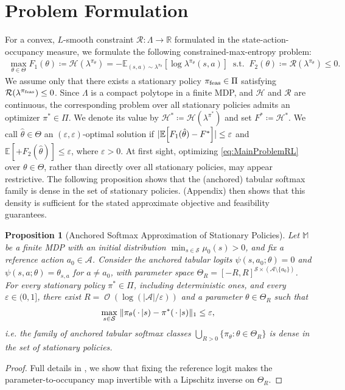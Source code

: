 \documentclass{article}
\theoremstyle{plain}
\newtheorem{proposition}[theorem]{Proposition}
\theoremstyle{definition}
\theoremstyle{remark}
\def\RR{{\mathbb{R}}}
\def\SS{{\mathcal{S}}}
\def\AA{{\mathcal{A}}}
\DeclareMathOperator{\OOSym}{\mathcal{O}}
\newcommand{\OO}[1]{{\OOSym\!\left(#1\right)}}
\newcommand{\card}[1]{\left|#1\right|}
\def\epsilon{{\varepsilon}}
\newcommand{\Exp}[1]{{ \mathbb{E}}\!\left[#1\right]}
\newcommand{\Expu}[2]{{\mathbb{E}}_{#1}\!\left[#2\right]}
\newcommand{\innerEmpty}{\,\cdot\,}
\DeclarePairedDelimiter{\abs}{\lvert}{\rvert}
\DeclarePairedDelimiter{\norm}{\lVert}{\rVert}
\DeclarePairedDelimiter{\plus}{[}{]_{+}}
\newcommand{\define}{\coloneqq}
\def\ss{{s}}
\def\MM{{\mathbb{M}}}
\def\HH{{\mathcal{H}}}
\def\Fopt{{F^*}}
\def\thetaHat{{\hat{\theta}}}
\def\aa{{a}}
\def\ss{{s}}
\def\Reg{{\mathcal{R}}}
\begin{document}
\section{Problem Formulation}
\label{sec:ProblemFormulation}
For a convex, $L$-smooth constraint $\Reg: \Lambda \to \RR$ formulated in
the state-action-occupancy measure, we formulate the following
constrained-max-entropy problem:
\begin{align}
 \max_{\theta \in \Theta} F_1(\theta)  \define \HH(\lambda^{\pi_\theta})
 = - \Expu{(\ss, \aa) \sim \lambda^{\pi_\theta}}{\log \lambda^{\pi_\theta}(\ss, \aa)} \;\;
 \mathrm{s.t.} \;\; F_2(\theta)        \define
 \Reg(\lambda^{\pi_\theta}) \leq 0.
 \tag{CME}
 \label{eq:MainProblemRL}
\end{align}
We assume only that there exists a stationary policy
$\pi_{\rm feas}\in\Pi$ satisfying
$\Reg(\lambda^{\pi_{\rm feas}})\leq0$. Since $\Lambda$ is a compact
polytope in a finite MDP, and $\HH$ and $\Reg$ are continuous, the
corresponding problem over all stationary policies admits an optimizer
$\pi^*\in\Pi$. We denote its value by
$\HH^*\define\HH(\lambda^{\pi^*})$ and set $\Fopt\define\HH^*$.
We call $\thetaHat \in \Theta$
an $(\epsilon,\epsilon)$-optimal solution if
$\abs{\Exp{F_1(\thetaHat)- \Fopt}} \leq \epsilon$
and $\Exp{\plus{F_2(\thetaHat)}} \leq \epsilon$,
where $\epsilon> 0$. At first sight, optimizing
\eqref{eq:MainProblemRL} over $\theta\in\Theta$, rather than directly over
all stationary policies, may appear restrictive. The following proposition
shows that the (anchored) tabular softmax family is dense in the set of
stationary policies.  (Appendix)
then shows that this density is sufficient for the stated approximate objective and
feasibility guarantees.
\begin{proposition}[Anchored Softmax Approximation of Stationary Policies]
 \label{prop:SoftmaxApproximationStationaryPolicies}
 Let $\MM$ be a finite MDP with an initial distribution
 $\min_{\ss \in \SS}\mu_0(\ss) > 0$, and fix a reference action
 $\aa_0\in\AA$. Consider the anchored tabular logits
 $\psi(\ss,\aa_0;\theta)=0$ and
 $\psi(\ss,\aa;\theta)=\theta_{\ss,\aa}$ for $\aa\neq\aa_0$, with
 parameter space
 $\Theta_R=[-R,R]^{\SS\times(\AA\setminus\{\aa_0\})}$.
 For every stationary policy $\pi^* \in \Pi$, including deterministic
 ones, and every $\epsilon \in (0,1]$, there exist
 $R = \OO{\log(\card{\AA} / \epsilon)}$ and a parameter
 $\theta \in \Theta_R$ such that
 \begin{align*}
  \max_{\ss \in \SS}\;\norm{\pi_{\theta}(\innerEmpty{}\vert\ss)
   - \pi^*(\innerEmpty{}\vert \ss)}_{1} \leq \epsilon,
 \end{align*}
 i.e. the family of anchored tabular softmax classes
 $\bigcup_{R>0}\{\pi_\theta:\theta\in\Theta_R\}$ is dense in the set
 of stationary policies.
\end{proposition}
\begin{proof}
 Full details in ,
 we show that fixing the reference logit makes the parameter-to-occupancy
 map invertible with a Lipschitz inverse on $\Theta_R$.
\end{proof}
\end{document}
